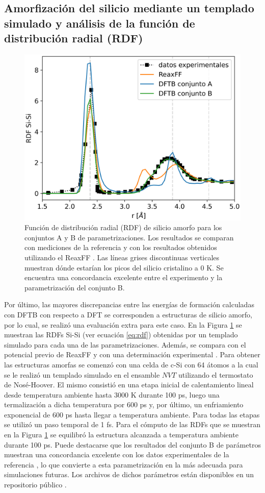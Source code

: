 \subsection{Amorfización del silicio mediante un templado simulado y análisis de la función de distribución radial (RDF)}\label{s:rdfb}

\begin{figure}[h!]
    \centering
    \includegraphics[width=.7\textwidth]{Silicio/modelo/resultados/rdf/rdf.png}
    \caption{Función de distribución radial (RDF) de silicio amorfo para los
    conjuntos A y B de parametrizaciones. Los resultados se comparan con 
    mediciones de la referencia \cite{laaziri1999} y con los resultados obtenidos
    utilizando el ReaxFF \cite{fan2013}. Las líneas grises discontinuas verticales
    muestran dónde estarían los picos del silicio cristalino a 0 K. Se encuentra 
    una concordancia excelente entre el experimento y la parametrización del 
    conjunto B.}
    \label{fig:rdfb}
\end{figure}

Por último, las mayores discrepancias entre las energías de formación calculadas con DFTB
con respecto a DFT se corresponden a estructuras de silicio amorfo, por lo cual,
se realizó una evaluación extra para este caso. En la Figura \ref{fig:rdfb} se 
muestran las RDFs Si-Si (ver ecuación \ref{eq:rdf}) obtenidas por un templado simulado para cada una de las
parametrizaciones. Además, se compara con el potencial previo de ReaxFF 
\cite{fan2013} y con una determinación experimental \cite{laaziri1999}. Para 
obtener las estructuras amorfas se comenzó con una celda de c-Si con 64 átomos 
a la cual se le realizó un templado simulado en el ensamble $NVT$ utilizando el 
termostato de Nosé-Hoover. El mismo consistió en una etapa inicial de 
calentamiento lineal desde temperatura ambiente hasta 3000 K durante 100 ps, luego una
termalización a dicha temperatura por 600 ps y, por último, un enfriamiento 
exponencial de 600 ps hasta llegar a temperatura ambiente. Para todas las etapas
se utilizó un paso temporal de 1 fs. Para el cómputo de las RDFs que se muestran
en la Figura \ref{fig:rdfb} se equilibró la estructura alcanzada a temperatura 
ambiente durante 100 ps. Puede destacarse que los resultados del conjunto B de parámetros muestran
una concordancia excelente con los datos experimentales de la referencia 
\cite{laaziri1999}, lo que convierte a esta parametrización en la más adecuada
para simulaciones futuras. Los archivos de dichos parámetros están disponibles
en un repositorio público \cite{dftb_lisi}.
